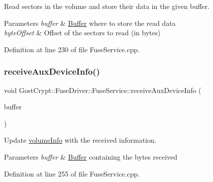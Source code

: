 Read sectors in the volume and store their data in the given buffer. 


\begin{DoxyParams}{Parameters}
{\em buffer} & \hyperlink{class_gost_crypt_1_1_buffer}{Buffer} where to store the read data \\
\hline
{\em byte\+Offset} & Offset of the sectors to read (in bytes) \\
\hline
\end{DoxyParams}


Definition at line 230 of file Fuse\+Service.\+cpp.

\mbox{\label{class_gost_crypt_1_1_fuse_driver_1_1_fuse_service_a4fd068071255017dfd44f33a28e358b5}} 
\subsubsection{\texorpdfstring{receive\+Aux\+Device\+Info()}{receiveAuxDeviceInfo()}}
{\footnotesize\ttfamily void Gost\+Crypt\+::\+Fuse\+Driver\+::\+Fuse\+Service\+::receive\+Aux\+Device\+Info (\begin{DoxyParamCaption}\item[{Q\+Byte\+Array \&}]{buffer }\end{DoxyParamCaption})\hspace{0.3cm}{\ttfamily [static]}}



Update \hyperlink{structvolume_info}{volume\+Info} with the received information. 


\begin{DoxyParams}{Parameters}
{\em buffer} & \hyperlink{class_gost_crypt_1_1_buffer}{Buffer} containing the bytes received \\
\hline
\end{DoxyParams}


Definition at line 255 of file Fuse\+Service.\+cpp.

\mbox{\label{class_gost_crypt_1_1_fuse_driver_1_1_fuse_service_a30816bb05f2a90ccceb72528c83d5758}} 
